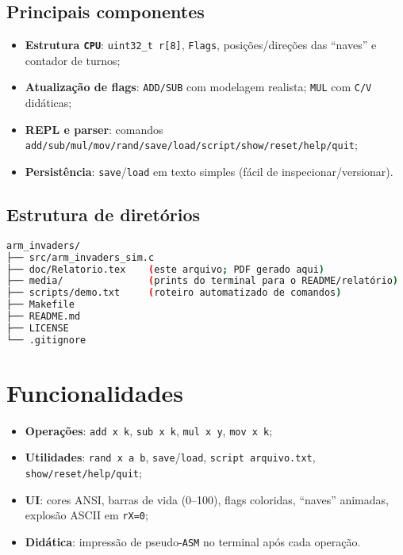 \documentclass[12pt,a4paper]{article}
\begin{document}
\subsection{Principais componentes}
\begin{itemize}[noitemsep]
  \item \textbf{Estrutura \texttt{CPU}}: \texttt{uint32\_t r[8]}, \texttt{Flags}, posições/direções das ``naves'' e contador de turnos;
  \item \textbf{Atualização de flags}: \texttt{ADD/SUB} com modelagem realista; \texttt{MUL} com \texttt{C/V} didáticas;
  \item \textbf{REPL e parser}: comandos \texttt{add/sub/mul/mov/rand/save/load/script/show/reset/help/quit};
  \item \textbf{Persistência}: \texttt{save}/\texttt{load} em texto simples (fácil de inspecionar/versionar).
\end{itemize}

\subsection{Estrutura de diretórios}
\begin{lstlisting}[language=bash]
arm_invaders/
├── src/arm_invaders_sim.c
├── doc/Relatorio.tex    (este arquivo; PDF gerado aqui)
├── media/               (prints do terminal para o README/relatório)
├── scripts/demo.txt     (roteiro automatizado de comandos)
├── Makefile
├── README.md
├── LICENSE
└── .gitignore
\end{lstlisting}

\section{Funcionalidades}
\begin{itemize}[noitemsep]
  \item \textbf{Operações}: \texttt{add x k}, \texttt{sub x k}, \texttt{mul x y}, \texttt{mov x k};
  \item \textbf{Utilidades}: \texttt{rand x a b}, \texttt{save}/\texttt{load}, \texttt{script arquivo.txt}, \texttt{show/reset/help/quit};
  \item \textbf{UI}: cores ANSI, barras de vida (0--100), flags coloridas, ``naves'' animadas, explosão ASCII em \texttt{rX=0};
  \item \textbf{Didática}: impressão de pseudo-\texttt{ASM} no terminal após cada operação.
\end{itemize}
\end{document}
